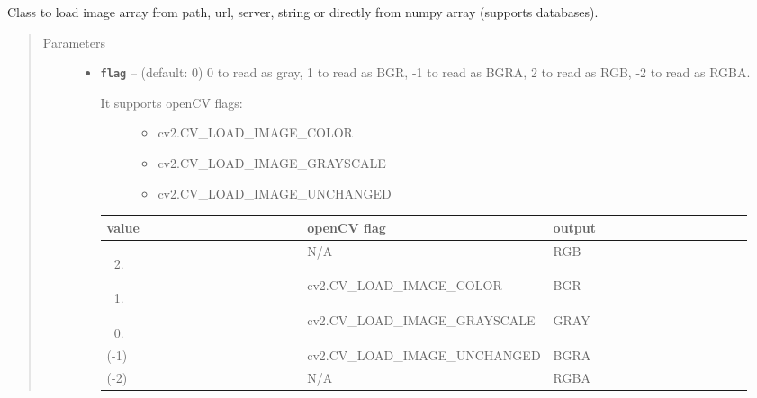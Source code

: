 \documentclass[letterpaper,10pt,english]{sphinxmanual}
\begin{document}
\begin{fulllineitems}
\label{RRtoolbox.lib:RRtoolbox.lib.image.ImLoader}
Class to load image array from path, url,
server, string or directly from numpy array (supports databases).
\begin{quote}\begin{description}
\item[{Parameters}] \leavevmode\begin{itemize}
\item {} 
\textbf{\texttt{flag}} -- 
(default: 0) 0 to read as gray, 1 to read as BGR, -1 to
read as BGRA, 2 to read as RGB, -2 to read as RGBA.
\begin{description}
\item[{It supports openCV flags:}] \leavevmode\begin{itemize}
\item {} 
cv2.CV\_LOAD\_IMAGE\_COLOR

\item {} 
cv2.CV\_LOAD\_IMAGE\_GRAYSCALE

\item {} 
cv2.CV\_LOAD\_IMAGE\_UNCHANGED

\end{itemize}

\end{description}

\begin{tabular}{|p{0.317\linewidth}|p{0.317\linewidth}|p{0.317\linewidth}|}
\hline
\textsf{\relax 
value
} & \textsf{\relax 
openCV flag
} & \textsf{\relax 
output
}\\
\hline\begin{enumerate}
\setcounter{enumi}{1}
\item {} 
\end{enumerate}
 & 
N/A
 & 
RGB
\\
\hline\begin{enumerate}
\item {} 
\end{enumerate}
 & 
cv2.CV\_LOAD\_IMAGE\_COLOR
 & 
BGR
\\
\hline\begin{enumerate}
\setcounter{enumi}{-1}
\item {} 
\end{enumerate}
 & 
cv2.CV\_LOAD\_IMAGE\_GRAYSCALE
 & 
GRAY
\\
\hline
(-1)
 & 
cv2.CV\_LOAD\_IMAGE\_UNCHANGED
 & 
BGRA
\\
\hline
(-2)
 & 
N/A
 & 
RGBA
\\
\hline\end{tabular}




\end{itemize}
\end{description}
\end{quote}
\end{fulllineitems}
\end{document}
